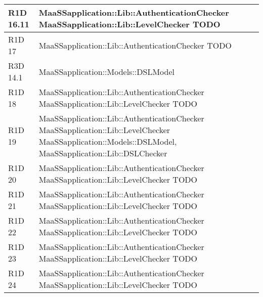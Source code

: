 \begin{center}
\begin{longtable}{ | l | p{8cm} |}
    R1D 16.11 & MaaSSapplication::Lib::AuthenticationChecker \newline MaaSSapplication::Lib::LevelChecker \newline  TODO \\ \hline
    
    R1D 17 & MaaSSapplication::Lib::AuthenticationChecker \newline TODO \\ \hline
    
    R3D 14.1 & MaaSSapplication::Models::DSLModel \\ \hline
    
    R1D 18 & MaaSSapplication::Lib::AuthenticationChecker \newline MaaSSapplication::Lib::LevelChecker \newline  TODO \\ \hline
    
    R1D 19 & MaaSSapplication::Lib::AuthenticationChecker \newline MaaSSapplication::Lib::LevelChecker \newline  MaaSSapplication::Models::DSLModel, MaaSSapplication::Lib::DSLChecker \newline\\ \hline
    
    R1D 20 & MaaSSapplication::Lib::AuthenticationChecker \newline MaaSSapplication::Lib::LevelChecker \newline  TODO \\ \hline
    
    R1D 21 & MaaSSapplication::Lib::AuthenticationChecker \newline MaaSSapplication::Lib::LevelChecker \newline  TODO \\ \hline
    
    R1D 22 & MaaSSapplication::Lib::AuthenticationChecker \newline MaaSSapplication::Lib::LevelChecker \newline  TODO \\ \hline
    
    R1D 23 & MaaSSapplication::Lib::AuthenticationChecker \newline MaaSSapplication::Lib::LevelChecker \newline  TODO \\ \hline
    
    R1D 24 & MaaSSapplication::Lib::AuthenticationChecker \newline MaaSSapplication::Lib::LevelChecker \newline  TODO \\ \hline
    

\end{longtable}
\end{center}
